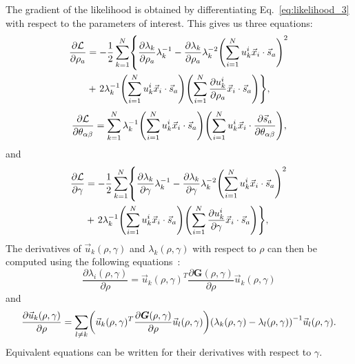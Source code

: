 \documentclass[preprint,amsmath,amssymb,superscriptaddress,showpacs,pre]{revtex4-1}
\let\originalleft\left
\let\originalright\right
\renewcommand{\left}{\mathopen{}\mathclose\bgroup\originalleft}
\renewcommand{\right}{\aftergroup\egroup\originalright}
\def\vx{\vec x}
\newcommand{\vsa}{\vec{s}_a}
\begin{document}
The gradient of the likelihood is obtained by differentiating Eq.~\eqref{eq:likelihood_3} with respect to the parameters of interest. 
This gives us  three equations: 
\begin{equation}
	\begin{split}
		\frac{\partial \mathcal{L}}{\partial\rho_a} &= -\frac 1 2 \sum_{k=1}^N \left\{ \frac{\partial\lambda_k}{\partial\rho_a}\lambda_k^{-1} - \frac{\partial\lambda_k}{\partial\rho_a} \lambda_k^{-2}\left(\sum_{i=1}^N u_{k}^i\vx_i\cdot\vsa\right)^2 \right. \\
		&+ \left. 2\lambda_k^{-1} \left(\sum_{i=1}^N u_k^i\vx_i\cdot\vsa\right) \left(\sum_{i=1}^N \frac{\partial u_k^i}{\partial\rho_a} \vx_i\cdot\vsa\right) \right\}, 
	\end{split}
	\label{eq:gradlikelihood_1}
\end{equation}
\begin{equation}
	\frac{\partial \mathcal{L}}{\partial\theta_{\alpha\beta}} = \sum_{k=1}^N \lambda_k^{-1} \left(\sum_{i=1}^N u_k^i\vx_i\cdot\vsa\right) \left(\sum_{i=1}^N u_k^i \vx_i\cdot\frac{\partial \vsa}{\partial\theta_{\alpha\beta}}\right),
	\label{eq:gradlikelihood_2}
\end{equation}
and
\begin{equation}
	\begin{split}
		\frac{\partial \mathcal{L}}{\partial\gamma} &= -\frac 1 2 \sum_{k=1}^N \left\{ \frac{\partial\lambda_k}{\partial\gamma}\lambda_k^{-1} - \frac{\partial\lambda_k}{\partial\gamma} \lambda_k^{-2}\left(\sum_{i=1}^N u_{k}^i\vx_i\cdot\vsa\right)^2 \right. \\
		&+ \left. 2\lambda_k^{-1} \left(\sum_{i=1}^N u_k^i\vx_i\cdot\vsa\right) \left(\sum_{i=1}^N \frac{\partial u_k^i}{\partial\gamma} \vx_i\cdot\vsa\right) \right\}, 
	\end{split}
	\label{eq:gradlikelihood_3}
\end{equation}
The derivatives of $\vec{u}_k(\rho,\gamma)$ and $\lambda_k(\rho,\gamma)$ with respect to $\rho$ can then be computed using the following equations~\cite{matrix_cook_book}: 
\begin{equation}
	\frac{\partial\lambda_i(\rho,\gamma)}{\partial\rho} = \vec{u}_k(\rho,\gamma)^T\frac{\partial\bm{G}(\rho,\gamma)}{\partial\rho}\vec{u}_k(\rho,\gamma)
	\label{eq:grad_eigval}
\end{equation}
and
\begin{equation}
	\frac{\partial \vec{u}_k(\rho,\gamma)}{\partial\rho} = \sum_{l\neq k} \left( \vec{u}_k(\rho,\gamma)^T\frac{\partial\bm{G}(\rho,\gamma)}{\partial\rho}\vec{u}_l(\rho,\gamma) \right) \left(\lambda_k(\rho,\gamma) - \lambda_l(\rho,\gamma)\right)^{-1} \vec{u}_l(\rho,\gamma).
	\label{eq:grad_eigvec}
\end{equation}
Equivalent equations can be written for their derivatives with respect to $\gamma$. 
\end{document}

